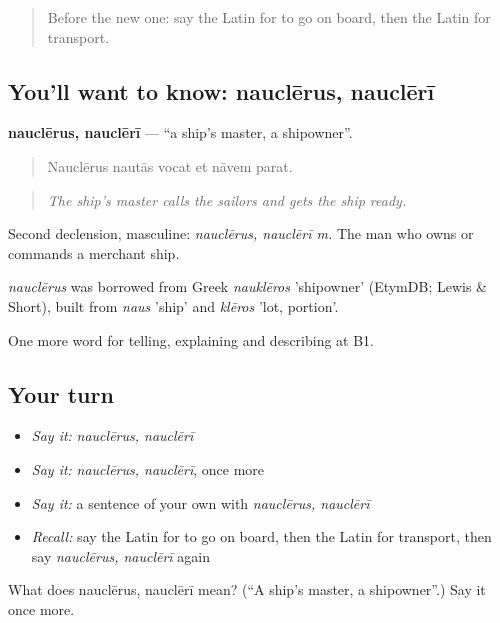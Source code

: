 \begin{quote}
Before the new one: say the Latin for to go on board, then the Latin for transport.
\end{quote}

\subsection*{You'll want to know: nauclērus, nauclērī}
\textbf{nauclērus, nauclērī} — \textquotedblleft{}a ship's master, a shipowner\textquotedblright{}.

\begin{quote}
Nauclērus nautās vocat et nāvem parat.
\end{quote}

\begin{quote}
\emph{The ship's master calls the sailors and gets the ship ready.}
\end{quote}

Second declension, masculine: \emph{nauclērus, nauclērī m.} The man who owns or commands a merchant ship.

\begin{cousinweb}
\emph{nauclērus} was borrowed from Greek \emph{nauklēros} 'shipowner' (EtymDB; Lewis \& Short), built from \emph{naus} 'ship' and \emph{klēros} 'lot, portion'.
\end{cousinweb}

\begin{grammarlens}[title={What you've built}]
One more word for telling, explaining and describing at B1.
\end{grammarlens}

\subsection*{Your turn}
\begin{itemize}
\raggedright
  \item \emph{Say it:} \emph{nauclērus, nauclērī}
  \item \emph{Say it:} \emph{nauclērus, nauclērī}, once more
  \item \emph{Say it:} a sentence of your own with \emph{nauclērus, nauclērī}
  \item \emph{Recall:} say the Latin for to go on board, then the Latin for transport, then say \emph{nauclērus, nauclērī} again
\end{itemize}

\begin{tcolorbox}[breakable,colback=teal!4,colframe=teal!35!black,title={Before you move on}]
What does nauclērus, nauclērī mean? (\textquotedblleft{}A ship's master, a shipowner\textquotedblright{}.) Say it once more.
\end{tcolorbox}
